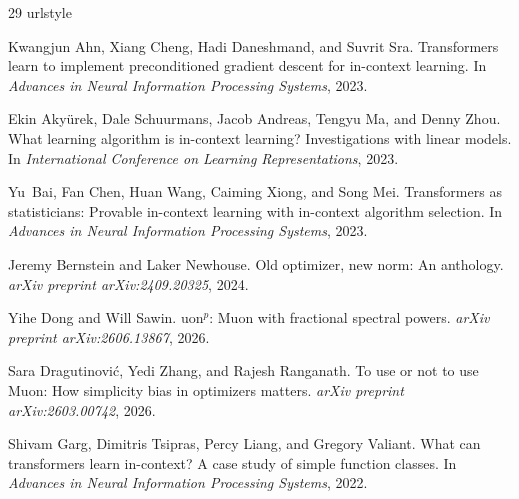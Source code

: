 \documentclass{article}
\begin{document}
\renewcommand{\bibfont}{\footnotesize}
\setlength{\bibsep}{1pt}
\begin{thebibliography}{29}
\providecommand{\natexlab}[1]{#1}
\providecommand{\url}[1]{\texttt{#1}}
\expandafter\ifx\csname urlstyle\endcsname\relax
  \providecommand{\doi}[1]{doi: #1}\else
  \providecommand{\doi}{doi: \begingroup \urlstyle{rm}\Url}\fi

Kwangjun Ahn, Xiang Cheng, Hadi Daneshmand, and Suvrit Sra.
\newblock Transformers learn to implement preconditioned gradient descent for
  in-context learning.
\newblock In \emph{Advances in Neural Information Processing Systems}, 2023.

Ekin Aky{\"u}rek, Dale Schuurmans, Jacob Andreas, Tengyu Ma, and Denny Zhou.
\newblock What learning algorithm is in-context learning? {I}nvestigations with
  linear models.
\newblock In \emph{International Conference on Learning Representations}, 2023.

Yu~Bai, Fan Chen, Huan Wang, Caiming Xiong, and Song Mei.
\newblock Transformers as statisticians: Provable in-context learning with
  in-context algorithm selection.
\newblock In \emph{Advances in Neural Information Processing Systems}, 2023.

Jeremy Bernstein and Laker Newhouse.
\newblock Old optimizer, new norm: An anthology.
\newblock \emph{arXiv preprint arXiv:2409.20325}, 2024.

Yihe Dong and Will Sawin.
uon$^p$: {M}uon with fractional spectral powers.
\newblock \emph{arXiv preprint arXiv:2606.13867}, 2026.

Sara Dragutinovi{\'c}, Yedi Zhang, and Rajesh Ranganath.
\newblock To use or not to use {M}uon: How simplicity bias in optimizers
  matters.
\newblock \emph{arXiv preprint arXiv:2603.00742}, 2026.

Shivam Garg, Dimitris Tsipras, Percy Liang, and Gregory Valiant.
\newblock What can transformers learn in-context? {A} case study of simple
  function classes.
\newblock In \emph{Advances in Neural Information Processing Systems}, 2022.


\end{thebibliography}
\end{document}
